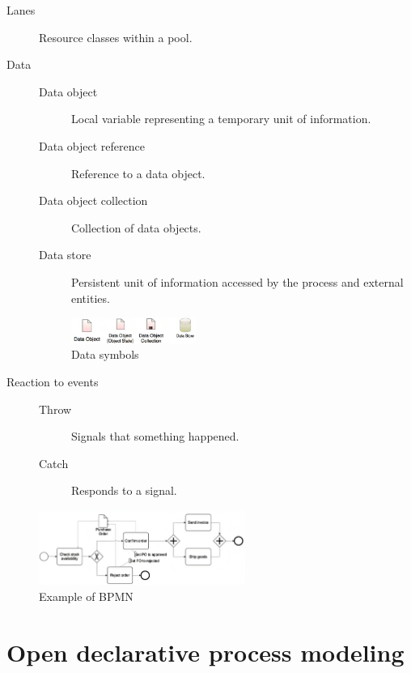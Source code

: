 \begin{description}
    \item[Lanes] 
        Resource classes within a pool.
    
    \item[Data]  \phantom{}
        \begin{description}
            \item[Data object] Local variable representing a temporary unit of information.
            \item[Data object reference] Reference to a data object.
            \item[Data object collection] Collection of data objects.
            \item[Data store] Persistent unit of information accessed by the process and external entities.
        \end{description}
        \begin{figure}[H]
            \centering
            \includegraphics[width=0.4\textwidth]{img/bpmn_data.png}
            \caption{Data symbols}
        \end{figure}

    \item[Reaction to events]  \phantom{}
        \begin{description}
            \item[Throw] Signals that something happened. 
            \item[Catch] Responds to a signal.
        \end{description}
\end{description}

\begin{figure}[H]
    \centering
    \includegraphics[width=0.6\textwidth]{img/bpmn_example1.png}
    \caption{Example of BPMN}
\end{figure}



\section{Open declarative process modeling}

